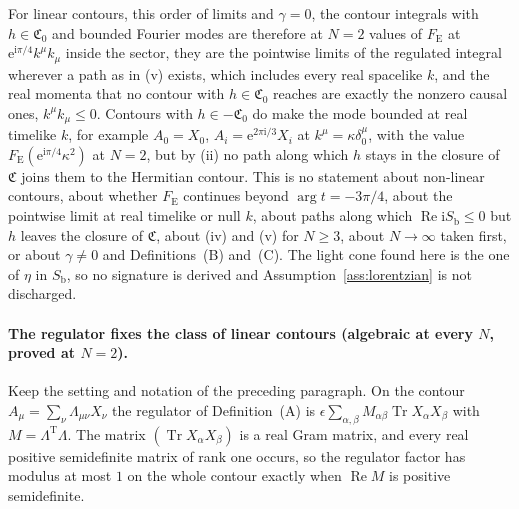 For linear contours, this order of limits and \(\gamma=0\), the contour integrals with \(h\in\mathfrak C_0\) and bounded Fourier modes are therefore at \(N=2\) values of \(F_{\mathrm E}\) at \(\mathrm e^{\mathrm i\pi/4}k^\mu k_\mu\) inside the sector, they are the pointwise limits of the regulated integral wherever a path as in (v) exists, which includes every real spacelike \(k\), and the real momenta that no contour with \(h\in\mathfrak C_0\) reaches are exactly the nonzero causal ones, \(k^\mu k_\mu\le0\). Contours with \(h\in-\mathfrak C_0\) do make the mode bounded at real timelike \(k\), for example \(A_0=X_0\), \(A_i=\mathrm e^{2\pi\mathrm i/3}X_i\) at \(k^\mu=\kappa\delta^\mu_0\), with the value \(F_{\mathrm E}(\mathrm e^{\mathrm i\pi/4}\kappa^2)\) at \(N=2\), but by (ii) no path along which \(h\) stays in the closure of \(\mathfrak C\) joins them to the Hermitian contour. This is no statement about non-linear contours, about whether \(F_{\mathrm E}\) continues beyond \(\arg t=-3\pi/4\), about the pointwise limit at real timelike or null \(k\), about paths along which \(\operatorname{Re}\mathrm iS_{\mathrm b}\le0\) but \(h\) leaves the closure of \(\mathfrak C\), about (iv) and (v) for \(N\ge3\), about \(N\to\infty\) taken first, or about \(\gamma\neq0\) and Definitions~(B) and~(C). The light cone found here is the one of \(\eta\) in \(S_{\mathrm b}\), so no signature is derived and Assumption~\ref{ass:lorentzian} is not discharged.

\paragraph{The regulator fixes the class of linear contours (algebraic at every \(N\), proved at \(N=2\)).}
Keep the setting and notation of the preceding paragraph. On the contour \(A_\mu=\sum_\nu\Lambda_{\mu\nu}X_\nu\) the regulator of Definition~(A) is \(\epsilon\sum_{\alpha,\beta}M_{\alpha\beta}\operatorname{Tr}X_\alpha X_\beta\) with \(M=\Lambda^{\mathrm T}\Lambda\). The matrix \((\operatorname{Tr}X_\alpha X_\beta)\) is a real Gram matrix, and every real positive semidefinite matrix of rank one occurs, so the regulator factor has modulus at most \(1\) on the whole contour exactly when \(\operatorname{Re}M\) is positive semidefinite.


